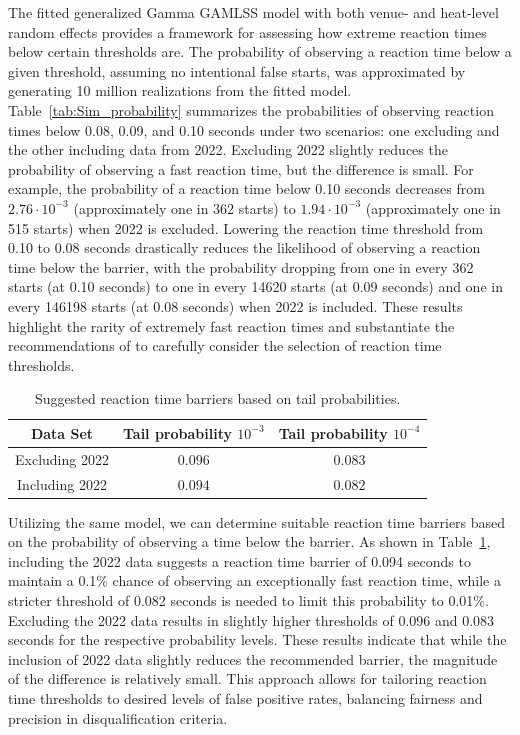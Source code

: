 \documentclass[12pt, letterpaper]{article}
\begin{document}
The fitted generalized Gamma GAMLSS model with both venue- and heat-level 
random effects provides a framework for assessing how extreme reaction times 
below certain thresholds are. The probability of observing a reaction time 
below a given threshold, assuming no intentional false starts, was approximated 
by generating 10 million realizations from the fitted model. 
Table~\ref{tab:Sim_probability} summarizes the probabilities of observing 
reaction times below 0.08, 0.09, and 0.10 seconds under two scenarios: one 
excluding and the other including data from 2022. Excluding 2022 slightly 
reduces the probability of observing a fast reaction time, but the difference 
is small. For example, the probability of a reaction time below 0.10 seconds 
decreases from $2.76 \cdot 10^{-3}$ (approximately one in 362 starts) to 
$1.94 \cdot 10^{-3}$ (approximately one in 515 starts) when 2022 is excluded. 
Lowering the reaction time threshold from 0.10 to 0.08 seconds drastically 
reduces the likelihood of observing a reaction time below the barrier, with 
the probability dropping from one in every 362 starts (at 0.10 seconds) to one 
in every 14620 starts (at 0.09 seconds) and one in every 146198 starts (at 0.08 
seconds) when 2022 is included. These results highlight the rarity of extremely 
fast reaction times and substantiate the recommendations of \citet{komi2009iaaf} 
to carefully consider the selection of reaction time thresholds.


\begin{table}
  \centering
  \caption{Suggested reaction time barriers based on tail probabilities.}
  \begin{tabular}{c c c} 
   \toprule
   Data Set & Tail probability  $10^{-3}$ & Tail probability $10^{-4}$ \\ 
   \midrule
   Excluding 2022 & $0.096$ & $0.083$ \\ 
   Including 2022 & $0.094$ & $0.082$ \\
   \bottomrule
  \end{tabular}
  \label{tab:Sim_time}
\end{table}

Utilizing the same model, we can determine suitable reaction time barriers 
based on the probability of observing a time below the barrier. As shown in 
Table~\ref{tab:Sim_time}, including the 2022 data suggests a reaction time 
barrier of 0.094 seconds to maintain a 0.1\% chance of observing an 
exceptionally fast reaction time, while a stricter threshold of 0.082 seconds 
is needed to limit this probability to 0.01\%. Excluding the 2022 data results 
in slightly higher thresholds of 0.096 and 0.083 seconds for the respective 
probability levels. These results indicate that while the inclusion of 2022 
data slightly reduces the recommended barrier, the magnitude of the difference 
is relatively small. This approach allows for tailoring reaction time 
thresholds to desired levels of false positive rates, balancing fairness and 
precision in disqualification criteria.
\end{document}
